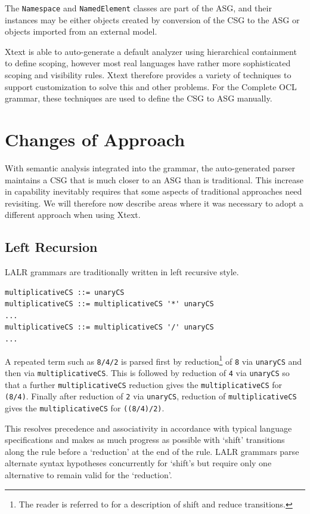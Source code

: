 \documentclass[runningheads,a4paper]{llncs}
\begin{document}
The \verb+Namespace+ and \verb+NamedElement+ classes are part of the ASG, and their instances may be either objects created by conversion of the CSG to the ASG or objects imported from an external model. 

Xtext is able to auto-generate a default analyzer using hierarchical containment to define scoping, however most real languages have rather more sophisticated scoping and visibility rules. Xtext therefore provides a variety of techniques to support customization to solve this and other problems. For the Complete OCL grammar, these techniques are used to define the CSG to ASG manually. 

\section{Changes of Approach}

With semantic analysis integrated into the grammar, the auto-generated parser maintains a CSG that is much closer to an ASG than is traditional. This increase in capability inevitably requires that some aspects of traditional approaches need revisiting. We will therefore now describe areas where it was necessary to adopt a different approach when using Xtext.

\subsection{Left Recursion}

LALR grammars are traditionally written in left recursive style. 

{\small\begin{verbatim}
multiplicativeCS ::= unaryCS
multiplicativeCS ::= multiplicativeCS '*' unaryCS
...
multiplicativeCS ::= multiplicativeCS '/' unaryCS
...
\end{verbatim}}

A repeated term such as \verb+8/4/2+ is parsed first by reduction\footnote{The reader is referred to \cite{dragon} for a description of shift and reduce transitions.} of \verb+8+ via \verb+unaryCS+ and then via \verb+multiplicativeCS+. This is followed by reduction of \verb+4+ via \verb+unaryCS+ so that a further \verb+multiplicativeCS+ reduction gives the  \verb+multiplicativeCS+ for \verb+(8/4)+. Finally after reduction of \verb+2+ via \verb+unaryCS+, reduction of \verb+multiplicativeCS+ gives the \verb+multiplicativeCS+ for \verb+((8/4)/2)+.

This resolves precedence and associativity in accordance with typical language specifications and makes as much progress as possible with `shift' transitions along the rule before a `reduction' at the end of the rule. LALR grammars parse alternate syntax hypotheses concurrently for `shift's but require only one alternative to remain valid for the `reduction'.
\end{document}
